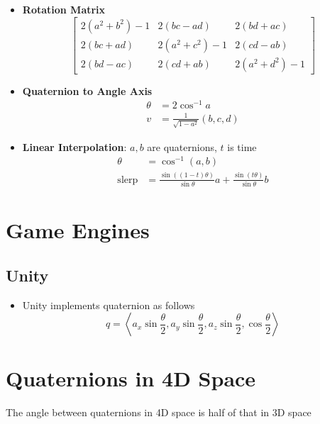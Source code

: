 \begin{itemize}
    \item \textbf{Rotation Matrix}
    \begin{equation}
      \begin{bmatrix}
        2\left( a^{2} + b^{2} \right) - 1 & 2\left( bc - ad \right) & 2\left( bd + ac \right) \\
        2\left( bc + ad \right) & 2\left( a^{2} + c^{2} \right) - 1 & 2\left( cd - ab \right) \\
        2\left( bd - ac \right) & 2\left( cd + ab \right) & 2\left( a^{2} + d^{2} \right) - 1
      \end{bmatrix}
    \end{equation}

    \item \textbf{Quaternion to Angle Axis}
    \begin{align}
      \theta &= 2 \cos^{-1} a \\
      v &= \frac{1}{\sqrt{1 - a^{2}}} \left( b, c, d \right)
    \end{align}

    \item \textbf{Linear Interpolation}: $ a, b $ are quaternions, $ t $ is time
    \begin{equation}
      \begin{split}
        \theta &= \cos^{-1}\left( a, b \right) \\
        \text{slerp} &= \frac{\sin\left( \left( 1 - t \right) \theta \right)}{\sin\theta} a
        + \frac{\sin\left( t \theta \right)}{\sin\theta} b
      \end{split}
    \end{equation}

  \end{itemize}

\section{Game Engines}

  \subsection{Unity}

    \begin{itemize}
      \item Unity implements quaternion as follows
      \begin{equation}
        q =
        \left<
          a_{x} \sin\frac{\theta}{2},
          a_{y} \sin\frac{\theta}{2},
          a_{z} \sin\frac{\theta}{2},
          \cos\frac{\theta}{2}
        \right>
      \end{equation}
    \end{itemize}

\section{Quaternions in 4D Space}

  The angle between quaternions in 4D space is half of that in 3D space
